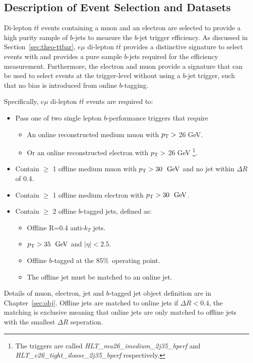 \newpage
\subsection{Description of Event Selection and Datasets}
\label{sec:trig-evtSel}

Di-lepton $t\bar{t}$ events containing a muon and an electron are selected to provide a high purity sample of $b$-jets to measure the $b$-jet trigger efficiency.
As discussed in Section~\ref{sec:theo-ttbar}, 
$e\mu$ di-lepton $t\bar{t}$ provides a distinctive signature to select events with and provides a pure sample $b$-jets required for the efficiency measurement.
Furthermore, the electron and muon provide a signature that can be used to select events at the trigger-level without using a $b$-jet trigger,
such that no bias is introduced from online $b$-tagging.

\noindent
Specifically, $e\mu$ di-lepton $t\bar{t}$ events are required to:
\begin{itemize}
\item Pass one of two single lepton $b$-performance triggers that require
    \begin{itemize}[label={$-$}]
    \item An online reconstructed medium muon with $p_{\mathrm{T}} >$ 26 GeV.
    \item Or an online reconstructed electron with $p_{\mathrm{T}} >$ 26 GeV \footnote{The triggers are called \textit{HLT\_mu26\_imedium\_2j35\_bperf} and \textit{HLT\_e26\_tight\_iloose\_2j35\_bperf} respectively.}.
    \end{itemize}
\item Contain $\geq$ 1 offline medium muon with $\pT>30~\GeV$ and no jet within $\Delta R$ of 0.4.
\item Contain $\geq$ 1 offline medium electron with $\pT>30~\GeV$.
\item Contain $\geq$ 2 offline $b$-tagged jets, defined as:
   \begin{itemize}[label={$-$}]
     \item Offline R=0.4 anti-$k_T$ jets.
     \item $\pT>35~\GeV$ and $|\eta|<2.5$.
     \item Offline $b$-tagged at the 85\%~operating point.
     \item The offline jet must be matched to an online jet.
    \end{itemize}
\end{itemize}

Details of muon, electron, jet and $b$-tagged jet object definition are in Chapter~\ref{sec:obj}.
Offline jets are matched to online jets if $\Delta R < 0.4$,
the matching is exclusive meaning that online jets are only matched to offline jets with the smallest $\Delta R$ seperation.

